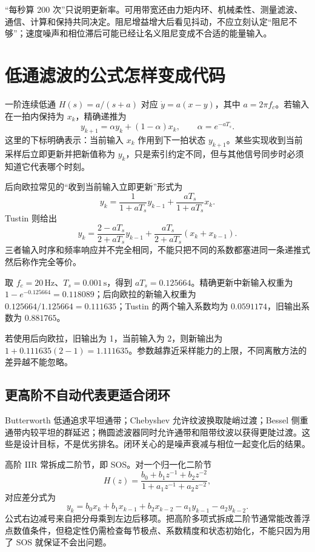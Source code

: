“每秒算 200 次”只说明更新率。可用带宽还由力矩内环、机械柔性、测量滤波、通信、计算和保持共同决定。阻尼增益增大后看见抖动，不应立刻认定“阻尼不够”；速度噪声和相位滞后可能已经让名义阻尼变成不合适的能量输入。

\section{低通滤波的公式怎样变成代码}

一阶连续低通 $H(s)=a/(s+a)$ 对应 $\dot y=a(x-y)$，其中 $a=2\pi f_c$。若输入在一拍内保持为 $x_k$，精确递推为
\[
y_{k+1}=\alpha y_k+(1-\alpha)x_k,
\qquad\alpha=e^{-aT_s}.
\]
这里的下标明确表示：当前输入 $x_k$ 作用到下一拍状态 $y_{k+1}$。某些实现收到当前采样后立即更新并把新值称为 $y_k$，只是索引约定不同，但与其他信号同步时必须知道它代表哪个时刻。

后向欧拉常见的“收到当前输入立即更新”形式为
\[
y_k=\frac{1}{1+aT_s}y_{k-1}
+\frac{aT_s}{1+aT_s}x_k.
\]
Tustin 则给出
\[
y_k=\frac{2-aT_s}{2+aT_s}y_{k-1}
+\frac{aT_s}{2+aT_s}(x_k+x_{k-1}).
\]
三者输入时序和频率响应并不完全相同，不能只把不同的系数都塞进同一条递推式然后称作完全等价。

\begin{examplebox}[算例 13E 计算 20 Hz 一阶低通系数]
取 $f_c=20\,\mathrm{Hz}$、$T_s=0.001\,\mathrm{s}$，得到 $aT_s=0.125664$。精确更新中新输入权重为 $1-e^{-0.125664}=0.118089$；后向欧拉的新输入权重为 $0.125664/1.125664=0.111635$；Tustin 的两个输入系数均为 $0.0591174$，旧输出系数为 $0.881765$。

若使用后向欧拉，旧输出为 1，当前输入为 2，则新输出为 $1+0.111635(2-1)=1.111635$。参数越靠近采样能力的上限，不同离散方法的差异越不能忽略。
\end{examplebox}

\subsection{更高阶不自动代表更适合闭环}

Butterworth 低通追求平坦通带；Chebyshev 允许纹波换取陡峭过渡；Bessel 侧重通带内较平坦的群延迟；椭圆滤波器同时允许通带和阻带纹波以获得更陡过渡。这些是设计目标，不是优劣排名。闭环关心的是噪声衰减与相位一起变化后的结果。

高阶 IIR 常拆成二阶节，即 SOS。对一个归一化二阶节
\[
H(z)=\frac{b_0+b_1z^{-1}+b_2z^{-2}}{1+a_1z^{-1}+a_2z^{-2}},
\]
对应差分式为
\[
y_k=b_0x_k+b_1x_{k-1}+b_2x_{k-2}-a_1y_{k-1}-a_2y_{k-2}.
\]
公式右边减号来自把分母乘到左边后移项。把高阶多项式拆成二阶节通常能改善浮点数值条件，但稳定性仍需检查每节极点、系数精度和状态初始化，不能只因为用了 SOS 就保证不会出问题。

